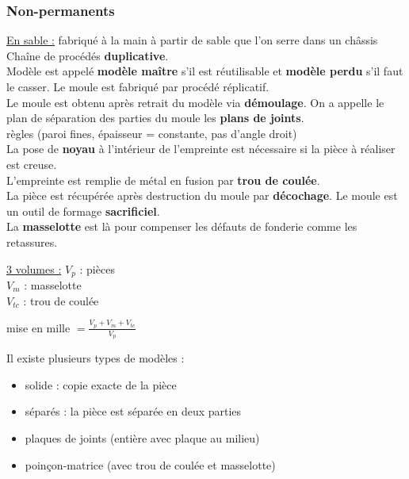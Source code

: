 \documentclass[../main.tex]{subfiles}
\begin{document}
\subsubsection{Non-permanents}
\underline{En sable :} fabriqué à la main à partir de sable que l'on serre dans un châssis\\
Chaîne de procédés \textbf{duplicative}.\\
Modèle est appelé \textbf{modèle maître} s'il est réutilisable et \textbf{modèle perdu} s'il faut le casser. Le moule est fabriqué par procédé réplicatif.\\
Le moule est obtenu après retrait du modèle via \textbf{démoulage}. On a appelle le plan de séparation des parties du moule les \textbf{plans de joints}.\\
\warning règles (paroi fines, épaisseur = constante, pas d'angle droit)\\

La pose de \textbf{noyau} à l'intérieur de l'empreinte est nécessaire si la pièce à réaliser est creuse.\\
L'empreinte est remplie de métal en fusion par \textbf{trou de coulée}. \\
La pièce est récupérée après destruction du moule par \textbf{décochage}. Le moule est un outil de formage \textbf{sacrificiel}. \\
La \textbf{masselotte} est là pour compenser les défauts de fonderie comme les retassures.\\

\begin{minipage}{.5\textwidth}
    \underline{3 volumes :} $V_p$ : pièces\\
    $V_m$ : masselotte\\
    $V_{tc}$ : trou de coulée\\
\end{minipage}
\begin{minipage}{.5\textwidth}
    mise en mille $= \frac{V_p + V_m + V_{tc}}{V_p}$
\end{minipage}

Il existe plusieurs types de modèles :\\
\begin{itemize}
    \item solide : copie exacte de la pièce\\
    \item séparés : la pièce est séparée en deux parties\\
    \item plaques de joints (entière avec plaque au milieu)\\
    \item poinçon-matrice (avec trou de coulée et masselotte)\\
\end{itemize}
\end{document}

